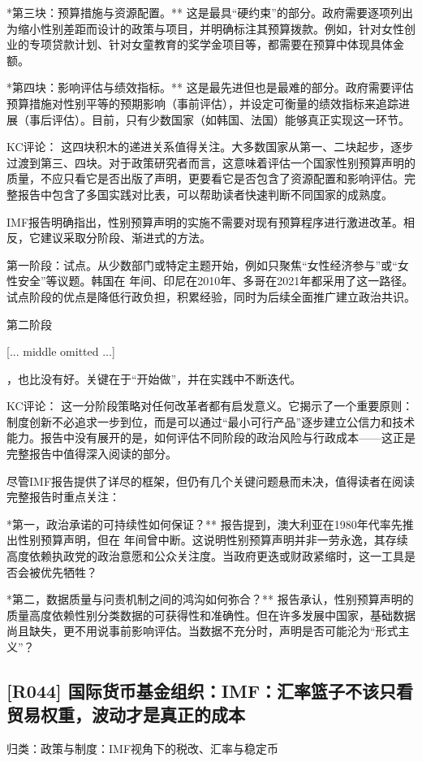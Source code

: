 \documentclass[11pt]{ctexart}
\begin{document}
*第三块：预算措施与资源配置。** 这是最具“硬约束”的部分。政府需要逐项列出为缩小性别差距而设计的政策与项目，并明确标注其预算拨款。例如，针对女性创业的专项贷款计划、针对女童教育的奖学金项目等，都需要在预算中体现具体金额。

*第四块：影响评估与绩效指标。** 这是最先进但也是最难的部分。政府需要评估预算措施对性别平等的预期影响（事前评估），并设定可衡量的绩效指标来追踪进展（事后评估）。目前，只有少数国家（如韩国、法国）能够真正实现这一环节。

KC评论： 这四块积木的递进关系值得关注。大多数国家从第一、二块起步，逐步过渡到第三、四块。对于政策研究者而言，这意味着评估一个国家性别预算声明的质量，不应只看它是否出版了声明，更要看它是否包含了资源配置和影响评估。完整报告中包含了多国实践对比表，可以帮助读者快速判断不同国家的成熟度。

IMF报告明确指出，性别预算声明的实施不需要对现有预算程序进行激进改革。相反，它建议采取分阶段、渐进式的方法。

第一阶段：试点。从少数部门或特定主题开始，例如只聚焦“女性经济参与”或“女性安全”等议题。韩国在 年间、印尼在2010年、多哥在2021年都采用了这一路径。试点阶段的优点是降低行政负担，积累经验，同时为后续全面推广建立政治共识。

第二阶段

[... middle omitted ...]

，也比没有好。关键在于“开始做”，并在实践中不断迭代。

KC评论： 这一分阶段策略对任何改革者都有启发意义。它揭示了一个重要原则：制度创新不必追求一步到位，而是可以通过“最小可行产品”逐步建立公信力和技术能力。报告中没有展开的是，如何评估不同阶段的政治风险与行政成本——这正是完整报告中值得深入阅读的部分。

尽管IMF报告提供了详尽的框架，但仍有几个关键问题悬而未决，值得读者在阅读完整报告时重点关注：

*第一，政治承诺的可持续性如何保证？** 报告提到，澳大利亚在1980年代率先推出性别预算声明，但在 年间曾中断。这说明性别预算声明并非一劳永逸，其存续高度依赖执政党的政治意愿和公众关注度。当政府更迭或财政紧缩时，这一工具是否会被优先牺牲？

*第二，数据质量与问责机制之间的鸿沟如何弥合？** 报告承认，性别预算声明的质量高度依赖性别分类数据的可获得性和准确性。但在许多发展中国家，基础数据尚且缺失，更不用说事前影响评估。当数据不充分时，声明是否可能沦为“形式主义”？

\subsection{[R044] 国际货币基金组织：IMF：汇率篮子不该只看贸易权重，波动才是真正的成本}
{\small\color{refgray}归类：政策与制度：IMF视角下的税改、汇率与稳定币}
\end{document}

